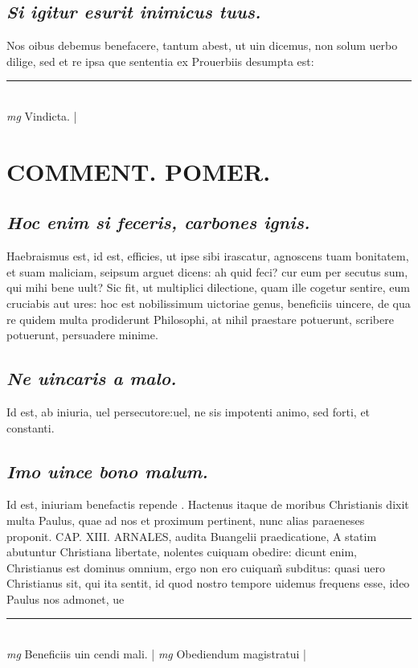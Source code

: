 \documentclass{article}
\begin{document}
\begin{pages}
\subsection*{\textit{Si igitur esurit inimicus tuus. }}\pstart Nos oibus debemus benefacere, tantum abest, ut uin dicemus, non solum uerbo dilige, sed et re ipsa que sententia ex Prouerbiis desumpta est:  \pend
\vspace{0.5cm}\noindent
\vspace{0.2cm}\rule{1cm}{0.2pt}\\ 
\hspace{0.2cm}\textit{mg}
\footnotesize Vindicta.  
\normalsize| 
\section*{COMMENT. POMER.  }
{}
\subsection*{\textit{Hoc enim si feceris, carbones ignis. }}\pstart Haebraismus est, id est, efficies, ut ipse sibi irascatur, agnoscens tuam bonitatem, et suam maliciam, seipsum arguet dicens: ah quid feci? cur eum per secutus sum, qui mihi bene uult? Sic fit, ut multiplici dilectione, quam ille cogetur sentire, eum cruciabis aut ures: hoc est nobilissimum uictoriae genus, beneficiis uincere, de qua re quidem multa prodiderunt Philosophi, at nihil praestare potuerunt, scribere potuerunt, persuadere minime.  \pend
{}
{}
\subsection*{\textit{Ne uincaris a malo. }}\pstart Id est, ab iniuria, uel persecutore:uel, ne sis impotenti animo, sed forti, et constanti.  \pend
{}
{}
\subsection*{\textit{Imo uince bono malum. }}\pstart Id est, iniuriam benefactis repende . Hactenus itaque de moribus Christianis dixit multa Paulus, quae ad nos et proximum pertinent, nunc alias paraeneses proponit.   \pend\pstart CAP. XIII.  \pend\pstart ARNALES, audita Buangelii praedicatione, A statim abutuntur Christiana libertate, nolentes cuiquam obedire: dicunt enim, Christianus est dominus omnium, ergo non ero cuiquam̃ subditus: quasi uero Christianus sit, qui ita sentit, id quod nostro tempore uidemus frequens esse, ideo Paulus nos admonet, ue  \pend
\vspace{0.5cm}\noindent
\vspace{0.2cm}\rule{1cm}{0.2pt}\\ 
\hspace{0.2cm}\textit{mg}
\footnotesize Beneficiis uin cendi mali. 
\normalsize| 
\hspace{0.2cm}\textit{mg}
\footnotesize Obediendum magistratui 
\normalsize| 

\end{pages}
\end{document}
